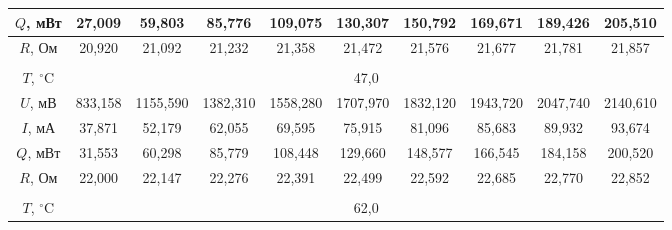 \documentclass[a4paper, 12pt]{article}
\begin{document}
\begin{table}[H]
\begin{tabular}{|cccccccccc|}
                \multicolumn{1}{|c|}{$Q$, мВт} & \multicolumn{1}{c|}{27,009}  & \multicolumn{1}{c|}{59,803}   & \multicolumn{1}{c|}{85,776}   & \multicolumn{1}{c|}{109,075}  & \multicolumn{1}{c|}{130,307}  & \multicolumn{1}{c|}{150,792}  & \multicolumn{1}{c|}{169,671}  & \multicolumn{1}{c|}{189,426} & \multicolumn{1}{c|}{205,510}  \\ \hline
                \multicolumn{1}{|c|}{$R$, Ом} & \multicolumn{1}{c|}{20,920}  & \multicolumn{1}{c|}{21,092}   & \multicolumn{1}{c|}{21,232} & \multicolumn{1}{c|}{21,358}   & \multicolumn{1}{c|}{21,472} & \multicolumn{1}{c|}{21,576}   & \multicolumn{1}{c|}{21,677}   & \multicolumn{1}{c|}{21,781} & \multicolumn{1}{c|}{21,857}   \\ \hline
                \multicolumn{10}{|c|}{} \\ \hline
                \multicolumn{1}{|c|}{$T$, $^\circ$C} & \multicolumn{9}{c|}{47,0} \\ \hline
                \multicolumn{1}{|c|}{$U$, мВ} & \multicolumn{1}{c|}{833,158} & \multicolumn{1}{c|}{1155,590} & \multicolumn{1}{c|}{1382,310} & \multicolumn{1}{c|}{1558,280} & \multicolumn{1}{c|}{1707,970} & \multicolumn{1}{c|}{1832,120} & \multicolumn{1}{c|}{1943,720} & \multicolumn{1}{c|}{2047,740} & \multicolumn{1}{c|}{2140,610} \\ \hline
                \multicolumn{1}{|c|}{$I$, мА} & \multicolumn{1}{c|}{37,871} & \multicolumn{1}{c|}{52,179} & \multicolumn{1}{c|}{62,055} & \multicolumn{1}{c|}{69,595} & \multicolumn{1}{c|}{75,915} & \multicolumn{1}{c|}{81,096} & \multicolumn{1}{c|}{85,683} & \multicolumn{1}{c|}{89,932} & \multicolumn{1}{c|}{93,674}   \\ \hline
                \multicolumn{1}{|c|}{$Q$, мВт} & \multicolumn{1}{c|}{31,553} & \multicolumn{1}{c|}{60,298} & \multicolumn{1}{c|}{85,779} & \multicolumn{1}{c|}{108,448} & \multicolumn{1}{c|}{129,660} & \multicolumn{1}{c|}{148,577} & \multicolumn{1}{c|}{166,545} & \multicolumn{1}{c|}{184,158} & \multicolumn{1}{c|}{200,520} \\ \hline
                \multicolumn{1}{|c|}{$R$, Ом} & \multicolumn{1}{c|}{22,000} & \multicolumn{1}{c|}{22,147} & \multicolumn{1}{c|}{22,276} & \multicolumn{1}{c|}{22,391} & \multicolumn{1}{c|}{22,499} & \multicolumn{1}{c|}{22,592} & \multicolumn{1}{c|}{22,685} & \multicolumn{1}{c|}{22,770} & \multicolumn{1}{c|}{22,852}   \\ \hline
                \multicolumn{10}{|c|}{} \\ \hline
                \multicolumn{1}{|c|}{$T$, $^\circ$C} & \multicolumn{9}{c|}{62,0} \\ \hline

\end{tabular}
\end{table}
\end{document}
